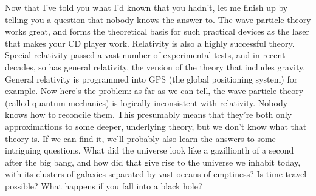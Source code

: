 Now that I've told you what I'd known that you hadn't, let me finish up by telling you a question
that nobody knows the answer to. The wave-particle theory works great, and forms the
theoretical basis for such practical devices as the laser that makes your CD player
work. Relativity is also a highly successful theory. Special relativity passed a vast
number of experimental tests, and in recent decades, so has general relativity, the
version of the theory that includes gravity. General relativity is programmed into
GPS (the global positioning system) for example. Now here's the problem: as far as
we can tell, the wave-particle theory (called quantum mechanics) is logically
inconsistent with relativity. Nobody knows how to reconcile them. This presumably
means that they're both only approximations to some deeper, underlying theory, but
we don't know what that theory is. If we can find it, we'll probably also learn the
answers to some intriguing questions. What did the universe look like a gazillionth
of a second after the big bang, and how did that give rise to the universe we inhabit
today, with its clusters of galaxies separated by vast oceans of emptiness? Is time
travel possible? What happens if you fall into a black hole?


